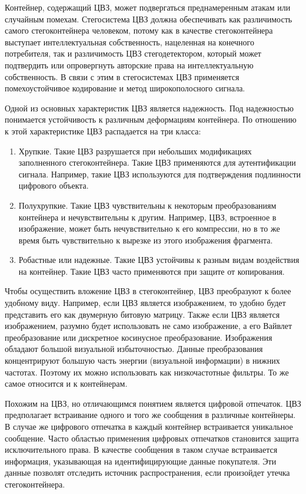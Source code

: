 Контейнер, содержащий ЦВЗ, может подвергаться преднамеренным атакам или случайным помехам.
Стегосистема ЦВЗ должна обеспечивать как различимость самого стегоконтейнера человеком,
потому как в качестве стегоконтейнера выступает интеллектуальная собственность,
нацеленная на конечного потребителя, так и различимость ЦВЗ стегодетектором,
который может подтвердить или опровергнуть авторские права на интеллектуальную собственность.
В связи с этим в стегосистемах ЦВЗ применяется помехоустойчивое кодирование и метод широкополосного сигнала.

Одной из основных характеристик ЦВЗ является надежность.
Под надежностью понимается устойчивость к различным деформациям контейнера.
По отношению к этой характеристике ЦВЗ распадается на три класса:
\begin{enumerate}
    \item Хрупкие.
    Такие ЦВЗ разрушается при небольших модификациях заполненного стегоконтейнера.
    Такие ЦВЗ применяются для аутентификации сигнала.
    Например, такие ЦВЗ используются для подтверждения подлинности цифрового объекта.
    \item Полухрупкие.
    Такие ЦВЗ чувствительны к некоторым преобразованиям контейнера и нечувствительны к другим.
    Например, ЦВЗ, встроенное в изображение, может быть нечувствительно к его компрессии,
    но в то же время быть чувствительно к вырезке из этого изображения фрагмента.
    \item Робастные или надежные.
    Такие ЦВЗ устойчивы к разным видам воздействия на контейнер.
    Такие ЦВЗ часто применяются при защите от копирования.
\end{enumerate}

Чтобы осуществить вложение ЦВЗ в стегоконтейнер, ЦВЗ преобразуют к более удобному виду.
Например, если ЦВЗ является изображением, то удобно будет представить его как двумерную
битовую матрицу. Также если ЦВЗ является изображением, разумно будет использовать не само
изображение, а его Вайвлет преобразование или дискретное косинусное преобразование. 
Изображения обладают большой визуальной избыточностью.
Данные преобразования концентрируют большую часть энергии (визуальной информации) в нижних частотах.
Поэтому их можно использовать как низкочастотные фильтры. То же самое относится и к контейнерам.

Похожим на ЦВЗ, но отличающимся понятием является цифровой отпечаток.
ЦВЗ предполагает встраивание одного и того же сообщения в различные контейнеры.
В случае же цифрового отпечатка в каждый контейнер встраивается уникальное сообщение.
Часто областью применения цифровых отпечатков становится защита исключительного права.
В качестве сообщения в таком случае встраивается информация, указывающая на идентифицирующие данные покупателя.
Эти данные позволят отследить источник распространения, если произойдет утечка стегоконтейнера.

